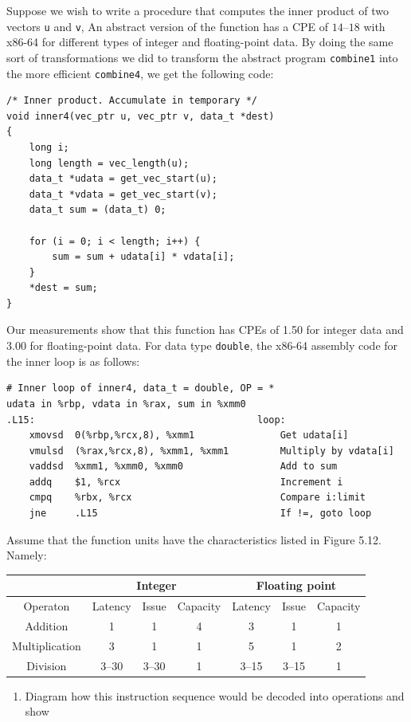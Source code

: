 \documentclass[12pt]{article}
\newenvironment{ex}[2][Exercise]{\begin{trivlist}
		\item[\hskip \labelsep {\bfseries #1}\hskip \labelsep {\bfseries #2.}]}{\end{trivlist}}
\begin{document}
\begin{ex}{5.13}
	Suppose we wish to write a procedure that computes the inner product of two vectors
	\texttt{u} and \texttt{v}, An abstract version of the function has a CPE of $14$--$18$
	with x86-64 for different types of integer and floating-point data. By doing the same
	sort of transformations we did to transform the abstract program \texttt{combine1} into
	the more efficient \texttt{combine4}, we get the following code:
	\begin{lstlisting}
/* Inner product. Accumulate in temporary */
void inner4(vec_ptr u, vec_ptr v, data_t *dest)
{
	long i;
	long length = vec_length(u);
	data_t *udata = get_vec_start(u);
	data_t *vdata = get_vec_start(v);
	data_t sum = (data_t) 0;
	
	for (i = 0; i < length; i++) {
		sum = sum + udata[i] * vdata[i];
	}
	*dest = sum;
}
	\end{lstlisting}
	Our measurements show that this function has CPEs of 1.50 for integer data and 3.00 for
	floating-point data. For data type \texttt{double}, the x86-64 assembly code for the
	inner loop is as follows:
	\begin{lstlisting}[language=={}]
# Inner loop of inner4, data_t = double, OP = *
udata in %rbp, vdata in %rax, sum in %xmm0
.L15:										loop:
	xmovsd	0(%rbp,%rcx,8), %xmm1				Get udata[i]
	vmulsd	(%rax,%rcx,8), %xmm1, %xmm1			Multiply by vdata[i]
	vaddsd	%xmm1, %xmm0, %xmm0					Add to sum
	addq	$1, %rcx							Increment i
	cmpq	%rbx, %rcx							Compare i:limit
	jne		.L15								If !=, goto loop
	\end{lstlisting}
	Assume that the function units have the characteristics listed in Figure 5.12. Namely:
	\begin{center}
		\begin{tabular}{c|ccc|ccc}
			{} & \multicolumn{3}{c}{Integer} & \multicolumn{3}{c}{Floating point}\\
			\hline
			Operaton & Latency & Issue & Capacity & Latency & Issue & Capacity\\
			\hline
			Addition & 1 & 1 & 4 & 3 & 1 & 1\\
			Multiplication & 3 & 1 & 1 & 5 & 1 & 2\\
			Division & 3--30 & 3--30 & 1 & 3--15 & 3--15 & 1
		\end{tabular}
	\end{center}
	\begin{enumerate}[label=(\alph*)]
		\item Diagram how this instruction sequence would be decoded into operations and show

\end{enumerate}
\end{ex}
\end{document}
